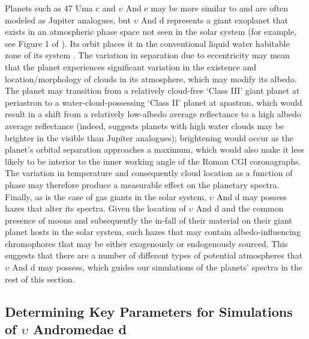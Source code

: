 \documentclass[12pt, letterpaper]{aastex631}
\begin{document}
Planets such as 47 Uma c and $\upsilon$ And e may be more similar to and are often modeled as Jupiter analogues, but $\upsilon$ And d represents a giant exoplanet that exists in an atmospheric phase space not seen in the solar system (for example, see Figure 1 of \textcite{2016AJ....152..217L}).  Its orbit places it in the conventional liquid water habitable zone of its system \citep{2006Icar..183..491B}.  The variation in separation due to eccentricity may mean that the planet experiences significant variation in the existence and location/morphology of clouds in its atmosphere, which may modify its albedo.  The planet may transition from a relatively cloud-free `Class III' giant planet at periastron to a water-cloud-possessing `Class II' planet at apastron, which would result in a shift from a relatively low-albedo average reflectance to a high albedo average reflectance (indeed, \textcite{2000ApJ...538..885S} suggests planets with high water clouds may be brighter in the visible than Jupiter analogues); brightening would occur as the planet's orbital separation approaches a maximum, which would also make it less likely to be interior to the inner working angle of the Roman CGI coronagraphs. The variation in temperature and consequently cloud location as a function of phase may therefore produce a measurable effect on the planetary spectra.  Finally, as is the case of gas giants in the solar system, $\upsilon$ And d may possess hazes that alter its spectra.  Given the location of $\upsilon$ And d and the common presence of moons and subsequently the in-fall of their material on their giant planet hosts in the solar system, such hazes that may contain albedo-influencing chromophores that may be either exogenously or endogenously sourced.  This suggests that there are a number of different types of potential atmospheres that $\upsilon$ And d may possess, which guides our simulations of the planets' spectra in the rest of this section. 

\subsection{Determining Key Parameters for Simulations of $\upsilon$ Andromedae d} \label{subsec:keyparams}
\end{document}
